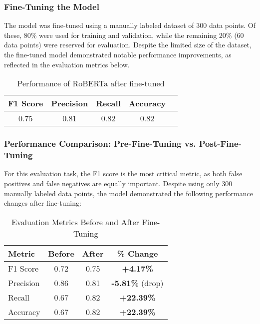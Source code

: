 \documentclass[letterpaper]{article}
\begin{document}
\subsubsection{Fine-Tuning the Model}

The model was fine-tuned using a manually labeled dataset of 300 data points. Of these, 80\% were used for training and validation, while the remaining 20\% (60 data points) were reserved for evaluation. Despite the limited size of the dataset, the fine-tuned model demonstrated notable performance improvements, as reflected in the evaluation metrics below.

\begin{table}[H]
    \centering
    \begin{tabular}{|c|c|c|c|c|}
        \hline
        \textbf{F1 Score} & \textbf{Precision} & \textbf{Recall} & \textbf{Accuracy} \\
        \hline
        0.75 & 0.81 & 0.82 & 0.82 \\
        \hline
    \end{tabular}
    \caption{Performance of RoBERTa after fine-tuned}
    \label{tab:Roberta_result_finetuned}
    \vspace{1.5em}
\end{table}

\subsubsection{Performance Comparison: Pre-Fine-Tuning vs. Post-Fine-Tuning}

For this evaluation task, the F1 score is the most critical metric, as both false positives and false negatives are equally important. Despite using only 300 manually labeled data points, the model demonstrated the following performance changes after fine-tuning:

\begin{table}[h]
\centering
\begin{tabular}{|l|c|c|c|}
\hline
\textbf{Metric} & \textbf{Before} & \textbf{After} & \textbf{\% Change} \\
\hline
F1 Score        & 0.72            & 0.75           & \textbf{+4.17\%}          \\
Precision       & 0.86            & 0.81           & \textbf{-5.81\%} (drop)   \\
Recall          & 0.67            & 0.82           & \textbf{+22.39\%}         \\
Accuracy        & 0.67            & 0.82           & \textbf{+22.39\%}         \\
\hline
\end{tabular}
\caption{Evaluation Metrics Before and After Fine-Tuning}
\label{tab:eval_metrics}
\end{table}
\end{document}

